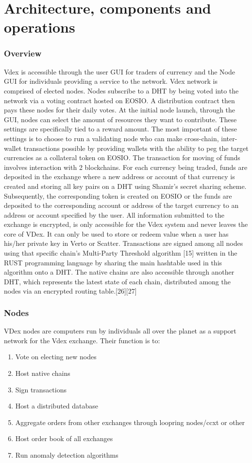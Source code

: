 \documentclass[]{article}
\begin{document}
{									
\section{Architecture, components and operations}
	
	\subsubsection{Overview}
	Vdex is accessible through the user GUI for traders of currency and the Node GUI for individuals providing a service to the network.     Vdex network is comprised of elected nodes.
	Nodes subscribe to a DHT 
	by being voted into the network via a voting contract hosted on EOSIO. 
	A distribution contract then pays these nodes for their daily votes.
	At the initial node launch, through the GUI, nodes can select the amount of resources they want to contribute.
	These settings are specifically tied to a reward amount.
	The most important of these settings is to choose to run a validating node who can make cross-chain, inter-wallet transactions possible by providing wallets with the ability to peg the target currencies as a collateral token on EOSIO. 
	The transaction for moving of funds involves interaction with 2 blockchains. 
	For each currency being traded, funds are deposited in the exchange where a new address or account of that currency is created and storing all key pairs on a DHT using Shamir's secret sharing scheme. Subsequently, the corresponding token is created on EOSIO or the funds are deposited to the corresponding account or address of the target currency to an address or account specified by the user.
	All information submitted to the exchange is encrypted, is only accessible for the Vdex system  and never leaves the core of VDex. It can only be used to store or redeem value when a user has his/her private key in Verto or Scatter.
	Transactions are signed among all nodes using that specific chain's Multi-Party Threshold algorithm [15] written in the RUST  programming language by sharing the main hashtable used in this algorithm onto a DHT. 
	The native chains are also accessible through another DHT, which represents the latest state of each chain, distributed among the nodes via an encrypted routing table.[26][27]
	 
\subsubsection{Nodes}
VDex nodes are computers run by individuals all over the planet as a support network for the Vdex exchange. 
Their function is to:\
\begin{enumerate}
	\item Vote on electing new nodes
	\item Host native chains
	\item Sign transactions
	\item Host a distributed database
	\item Aggregate orders from other exchanges through loopring nodes/ccxt or other 
	\item Host order book of all exchanges
	\item Run anomaly detection algorithms


\end{enumerate}}
\end{document}
